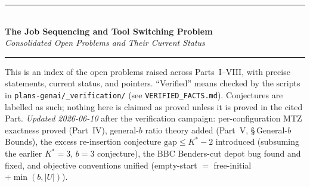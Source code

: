 \documentclass[11pt,a4paper]{article}
\newcommand{\Kstar}{K^{*}}
\begin{document}
\begin{center}
  {\color{navyblue}\rule{\textwidth}{2pt}}\\[0.4cm]
  {\LARGE\bfseries\color{navyblue}The Job Sequencing and Tool Switching Problem}\\[0.3cm]
  {\large\itshape\color{midblue}Consolidated Open Problems and Their Current Status}\\[0.2cm]
  {\color{navyblue}\rule{\textwidth}{2pt}}
\end{center}
\vspace{0.3cm}
\begin{mdframed}[backgroundcolor=lightblue,linecolor=navyblue,linewidth=1pt,
  innerleftmargin=14pt,innerrightmargin=14pt,innertopmargin=8pt,innerbottommargin=8pt]
\small This is an index of the open problems raised across Parts~I--VIII, with precise
statements, current status, and pointers. ``Verified'' means checked by the scripts in
\texttt{plans-genai/\_verification/} (see \texttt{VERIFIED\_FACTS.md}). Conjectures are
labelled as such; nothing here is claimed as proved unless it is proved in the cited Part.
\emph{Updated 2026-06-10} after the verification campaign: per-configuration MTZ
exactness proved (Part~IV), general-$b$ ratio theory added (Part~V,
\S\,General-$b$ Bounds), the excess re-insertion conjecture
$\mathrm{gap}\le\Kstar-2$ introduced (subsuming the earlier $\Kstar{=}3$, $b{=}3$
conjecture), the BBC Benders-cut depot bug found and fixed, and objective
conventions unified (empty-start $=$ free-initial $+\min(b,|U|)$).
\end{mdframed}
\vspace{0.3cm}
\end{document}
